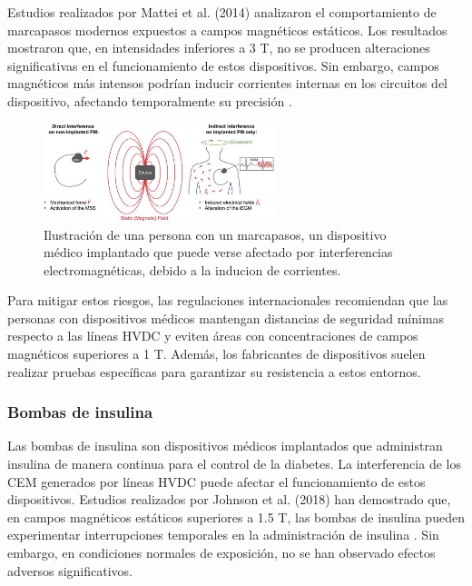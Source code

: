 Estudios realizados por Mattei et al. (2014) analizaron el comportamiento de marcapasos modernos expuestos a campos magnéticos estáticos. Los resultados mostraron que, en intensidades inferiores a 3 T, no se producen alteraciones significativas en el funcionamiento de estos dispositivos. Sin embargo, campos magnéticos más intensos podrían inducir corrientes internas en los circuitos del dispositivo, afectando temporalmente su precisión \cite{Mattei2014Pacemakers}.\\
\begin{figure}
	\centering
	\includegraphics[width=0.6\textwidth]{img/ejemplos/Figure_5}
	\caption{Ilustración de una persona con un marcapasos, un dispositivo médico implantado que puede verse afectado por interferencias electromagnéticas, debido a la inducion de corrientes.}
	\label{fig:figure_5}
\end{figure}
Para mitigar estos riesgos, las regulaciones internacionales recomiendan que las personas con dispositivos médicos mantengan distancias de seguridad mínimas respecto a las líneas HVDC y eviten áreas con concentraciones de campos magnéticos superiores a 1 T. Además, los fabricantes de dispositivos suelen realizar pruebas específicas para garantizar su resistencia a estos entornos.
\subsubsection{Bombas de insulina}
Las bombas de insulina son dispositivos médicos implantados que administran insulina de manera continua para el control de la diabetes. La interferencia de los CEM generados por líneas HVDC puede afectar el funcionamiento de estos dispositivos. Estudios realizados por Johnson et al. (2018) han demostrado que, en campos magnéticos estáticos superiores a 1.5 T, las bombas de insulina pueden experimentar interrupciones temporales en la administración de insulina \cite{Johnson2018InsulinPumps}. Sin embargo, en condiciones normales de exposición, no se han observado efectos adversos significativos.

